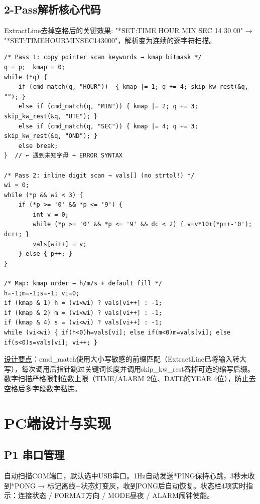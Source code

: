 \documentclass[12pt,hyperref,a4paper,UTF8]{ctexart}
\begin{document}
\subsection{2-Pass解析核心代码}

ExtractLine去掉空格后的关键效果: "*SET:TIME HOUR MIN SEC 14 30 00" → "*SET:TIMEHOURMINSEC143000"，解析变为连续的逐字符扫描。

\begin{verbatim}
/* Pass 1: copy pointer scan keywords → kmap bitmask */
q = p;  kmap = 0;
while (*q) {
    if (cmd_match(q, "HOUR"))  { kmap |= 1; q += 4; skip_kw_rest(&q, ""); }
    else if (cmd_match(q, "MIN")) { kmap |= 2; q += 3; skip_kw_rest(&q, "UTE"); }
    else if (cmd_match(q, "SEC")) { kmap |= 4; q += 3; skip_kw_rest(&q, "OND"); }
    else break;
}  // ← 遇到未知字母 → ERROR SYNTAX

/* Pass 2: inline digit scan → vals[] (no strtol!) */
wi = 0;
while (*p && wi < 3) {
    if (*p >= '0' && *p <= '9') {
        int v = 0;
        while (*p >= '0' && *p <= '9' && dc < 2) { v=v*10+(*p++-'0'); dc++; }
        vals[wi++] = v;
    } else { p++; }
}

/* Map: kmap order → h/m/s + default fill */
h=-1;m=-1;s=-1; vi=0;
if (kmap & 1) h = (vi<wi) ? vals[vi++] : -1;
if (kmap & 2) m = (vi<wi) ? vals[vi++] : -1;
if (kmap & 4) s = (vi<wi) ? vals[vi++] : -1;
while (vi<wi) { if(h<0)h=vals[vi]; else if(m<0)m=vals[vi]; else if(s<0)s=vals[vi]; vi++; }
\end{verbatim}

\noindent\underline{设计要点}：cmd\_match使用大小写敏感的前缀匹配（ExtractLine已将输入转大写），每次调用后指针跳过关键词长度并调用skip\_kw\_rest吞掉可选的缩写后缀。数字扫描严格限制位数上限（TIME/ALARM 2位、DATE的YEAR 4位），防止去空格后多字段数字黏连。

\section{PC端设计与实现}

\subsection{P1 串口管理}

自动扫描COM端口，默认选中USB串口。1Hz自动发送*PING保持心跳，3秒未收到*PONG → 标记离线+状态灯变灰，收到PONG后自动恢复。状态栏4项实时指示：连接状态 / FORMAT方向 / MODE昼夜 / ALARM闹钟使能。
\end{document}
